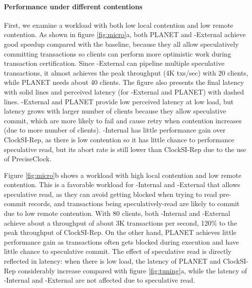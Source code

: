 \paragraph{Performance under different contentions} First, we examine a workload with both low local contention and low remote contention. As shown in figure \ref{fig:micro}a, both PLANET and {\specula}-External achieve good speedup compared with the baseline, because they all allow speculatively committing transactions so clients can perform more optimistic work during transaction certification. Since {\specula}-External can pipeline multiple speculative transactions, it almost achieves the peak throughput (4K txs/sec) with 20 clients, while PLANET needs about 40 clients. The figure also presents the final latency with solid lines and perceived latency (for {\specula}-External and PLANET) with dashed lines. {\specula}-External and PLANET provide low perceived latency at low load, but latency grows with larger number of clients because they allow speculative commit, which are more likely to fail and cause retry when contention increases (due to more number of clients). {\specula}-Internal has little performance gain over ClockSI-Rep, as there is low contention so it has little chance to performance speculative read, but its abort rate is still lower than ClockSI-Rep due to the use of PreciseClock. 

Figure \ref{fig:micro}b shows a workload with high local contention and low remote contention. This is a favorable workload for {\specula}-Internal and {\specula}-External that allows speculative read, as they can avoid getting blocked when trying to read pre-commit records, and transactions being speculatively-read are likely to commit due to low remote contention. With 80 clients, both {\specula}-Internal and {\specula}-External achieve about a throughput of about 3K transactions per second, 120\% to the peak throughput of ClockSI-Rep. On the other hand, PLANET achieves little performance gain as transactions often gets blocked during execution and have little chance to speculative commit. The effect of speculative read is directly reflected in latency: when there is low load, the latency of PLANET and ClockSI-Rep considerably increase compared with figure \ref{fig:tuning}a, while the latency of {\specula}-Internal and {\specula}-External are not affected due to speculative read.

